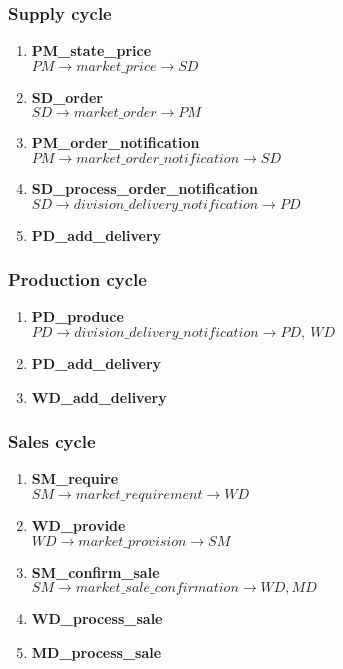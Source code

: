 \documentclass[11pt]{article}
\begin{document}
\subsubsection{Supply cycle}
\begin{enumerate}
	\item \textbf{PM\_state\_price} \\
	$ PM \rightarrow market\_price \rightarrow SD $
	\item \textbf{SD\_order} \\
	$ SD \rightarrow market\_order \rightarrow PM $
	\item \textbf{PM\_order\_notification} \\
	$ PM \rightarrow market\_order\_notification \rightarrow SD $
	\item \textbf{SD\_process\_order\_notification} \\
	$ SD \rightarrow division\_delivery\_notification \rightarrow PD $
	\item \textbf{PD\_add\_delivery}
		
\end{enumerate}

\subsubsection{Production cycle}
\begin{enumerate}
	\item \textbf{PD\_produce} \\
	$ PD \rightarrow division\_delivery\_notification \rightarrow PD,\ WD $
	\item \textbf{PD\_add\_delivery}
	\item \textbf{WD\_add\_delivery}
\end{enumerate}

\subsubsection{Sales cycle}
\begin{enumerate}
	\item \textbf{SM\_require} \\
	$ SM \rightarrow market\_requirement \rightarrow WD $
	\item \textbf{WD\_provide} \\
	$ WD \rightarrow market\_provision \rightarrow SM $
	\item \textbf{SM\_confirm\_sale} \\
	$ SM \rightarrow market\_sale\_confirmation \rightarrow WD, MD $
	\item \textbf{WD\_process\_sale}
	\item \textbf{MD\_process\_sale}
\end{enumerate}
\end{document}
